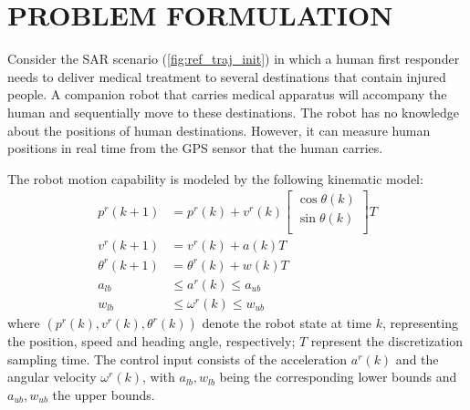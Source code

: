 \documentclass[letterpaper, 10 pt, conference]{ieeeconf}
\begin{document}
	\section{PROBLEM FORMULATION}\label{sec:formulation}
	Consider the SAR scenario (\cref{fig:ref_traj_init}) in which a human first responder needs to deliver medical treatment to several destinations that contain injured people. 
	A companion robot that carries medical apparatus will accompany the human and sequentially move to these destinations.
	The robot has no knowledge about the positions of human destinations.
	However, it can measure human positions in real time from the GPS sensor that the human carries.
	
	The robot motion capability is modeled by the following kinematic model:
	\begin{subequations}
		\begin{align}
			p^r(k+1)&=p^r(k)+v^r(k)
			\left[ 
			\begin{array}{c}
				\cos \theta(k)\\
				\sin \theta(k)\\
			\end{array}
			\right]T\label{eqn:constr:dyn_pre_motion}\\
			v^r(k+1)&=v^r(k)+a(k)T\label{eqn:constr:dyn_pre_v}\\
			\theta^r(k+1)&=\theta^r(k)+w(k)T\label{eqn:constr:dyn_pre_theta}\\
			a_{lb}&\le a^r(k)\le a_{ub}\label{eqn:constr:a}\\
			w_{lb}&\le \omega^r(k)\le w_{ub}\label{eqn:constr:w}
		\end{align}
	\end{subequations}
	where $(p^r(k),v^r(k),\theta^r(k))$ denote the robot state at time $k$, representing the position, speed and heading angle, respectively; $T$ represent the discretization sampling time.
	The control input consists of the acceleration $a^r(k)$ and the angular velocity $\omega^r(k)$, with $a_{lb},w_{lb}$ being the corresponding lower bounds and $a_{ub},w_{ub}$ the upper bounds.
	
\end{document}
